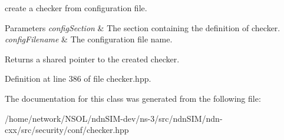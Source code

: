 create a checker from configuration file. 


\begin{DoxyParams}{Parameters}
{\em config\+Section} & The section containing the definition of checker. \\
\hline
{\em config\+Filename} & The configuration file name. \\
\hline
\end{DoxyParams}
\begin{DoxyReturn}{Returns}
a shared pointer to the created checker. 
\end{DoxyReturn}


Definition at line 386 of file checker.\+hpp.



The documentation for this class was generated from the following file\+:\begin{DoxyCompactItemize}
\item 
/home/network/\+N\+S\+O\+L/ndn\+S\+I\+M-\/dev/ns-\/3/src/ndn\+S\+I\+M/ndn-\/cxx/src/security/conf/checker.\+hpp\end{DoxyCompactItemize}
